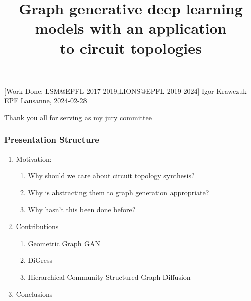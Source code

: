 \documentclass[11pt,
xcolor={dvipsnames},
hyperref={pdftex,pdfpagemode=UseNone,hidelinks,pdfdisplaydoctitle=true},
usepdftitle=false,
aspectratio=169]{beamer}
\begin{document}
\title{\justifying Graph generative deep learning models with an application\\ to circuit topologies}
\information%
[Work Done: LSM@EPFL 2017-2019,LIONS@EPFL 2019-2024]%
{Igor Krawczuk}%
{EPF Lausanne,  2024-02-28}
\frame[label=title]{\titlepage}
\begin{frame}[label=done,c]
  \centering
  \Huge Thank you all for serving as my jury committee
\end{frame}


\begin{frame}[label=done]
  \frametitle{Presentation Structure}
  \centering
  \begin{enumerate}
    \item Motivation:
      \begin{enumerate}
        \item Why should we care about circuit topology synthesis?
        \item Why is  abstracting them to graph generation appropriate?
        \item Why hasn't this been done before?
      \end{enumerate}
    \item Contributions
      \begin{enumerate}
        \item Geometric Graph GAN
        \item DiGress
        \item Hierarchical Community Structured Graph Diffusion
      \end{enumerate}
    \item Conclusions %
  \end{enumerate} 
  \vspace{1cm} %
\end{frame}
\end{document}
